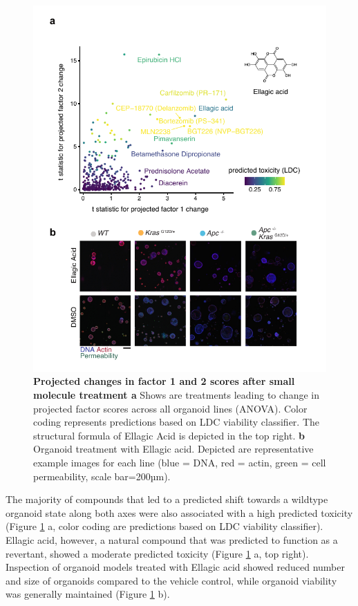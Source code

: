 \begin{flushleft}
\begin{figure}[h]
\centering
\includegraphics[scale=0.75,
                keepaspectratio]{figures/adenomaprofiling/pdf/fig_5_1.pdf}
\caption{\textbf{Projected changes in factor 1 and 2 scores after small molecule treatment a} Shows are treatments leading to change in projected factor scores across all organoid lines (ANOVA). Color coding represents predictions based on LDC viability classifier. The structural formula of Ellagic Acid is depicted in the top right. \textbf{b} Organoid treatment with Ellagic acid. Depicted are representative example images for each line (blue = DNA, red = actin, green = cell permeability, scale bar=200µm).}
\label{fig_310}
\end{figure}
\bigbreak

The majority of compounds that led to a predicted shift towards a wildtype organoid state along both axes were also associated with a high predicted toxicity (Figure \ref{fig_310} a, color coding are predictions based on LDC viability classifier). Ellagic acid, however, a natural compound that was predicted to function as a revertant, showed a moderate predicted toxicity (Figure \ref{fig_310} a, top right). Inspection of organoid models treated with Ellagic acid showed reduced number and size of organoids compared to the vehicle control, while organoid viability was generally maintained (Figure \ref{fig_310} b). 


\end{flushleft}
